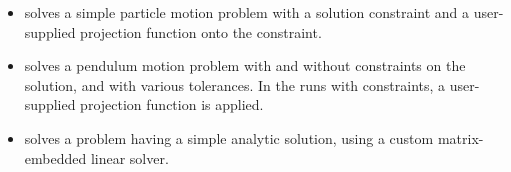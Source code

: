 \begin{itemize}
  (1) a matrix, only defined implicitly, based on a fixed number of     
  Gauss-Seidel iterations using the diffusion terms only; and               
  (2) a block-diagonal matrix based on the partial derivatives of the   
  interaction terms only, using block-grouping.                          
  \newline
  Four different runs are made for this problem.                        
  The product preconditioner is applied on the left and on the right.    
  In each case, both the modified and classical Gram-Schmidt options    
  are tested.
\item {} solves a simple particle motion problem
  with a solution constraint and a user-supplied projection function
  onto the constraint.
\item {} solves a pendulum motion problem with and
  without constraints on the solution, and with various tolerances.  In the
  runs with constraints, a user-supplied projection function is applied.
\item {} solves a problem having a simple analytic
  solution, using a custom matrix-embedded linear solver.



\end{itemize}
